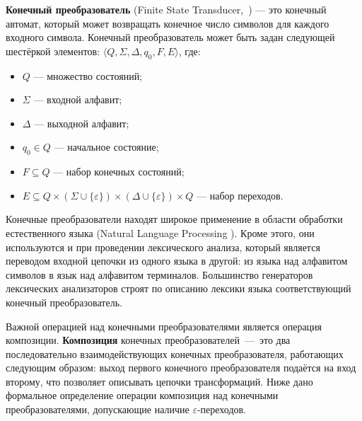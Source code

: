 \begin{mydef}

\textbf{Конечный преобразователь} (Finite State Transducer,~\cite{FST}) {---} это конечный автомат, который может возвращать конечное число символов для каждого входного символа. Конечный преобразователь может быть задан следующей шестёркой элементов: $\langle Q, \Sigma, \Delta, q_0, F, E \rangle$, где:

\begin{itemize}
\item $Q$ --- множество состояний; 
\item $\Sigma$ --- входной алфавит;
\item $\Delta$ --- выходной алфавит; 
\item $q_0 \in Q$ --- начальное состояние;
\item $F \subseteq Q$ --- набор конечных состояний; 
\item $E \subseteq Q \times (\Sigma \cup \{\varepsilon\}) \times (\Delta \cup \{\varepsilon\})  \times Q$ --- набор переходов. 
\end{itemize}

\end{mydef}

Конечные преобразователи находят широкое применение в области обработки естественного языка (Natural Language Processing \cite{Mohri}). Кроме этого, они используются и при проведении лексического анализа, который является переводом входной цепочки из одного языка в другой: из языка над алфавитом символов в язык над алфавитом терминалов. Большинство генераторов лексических анализаторов строят по описанию лексики языка соответствующий конечный преобразователь.

Важной операцией над конечными преобразователями является операция композиции. \textbf{Композиция} конечных преобразователей~{---}~это два последовательно  взаимодействующих конечных преобразователя, работающих следующим образом: выход первого конечного преобразователя подаётся на вход второму, что позволяет описывать цепочки трансформаций. Ниже дано формальное определение операции композиция над конечными преобразователями, допускающие наличие $\varepsilon$-переходов.

